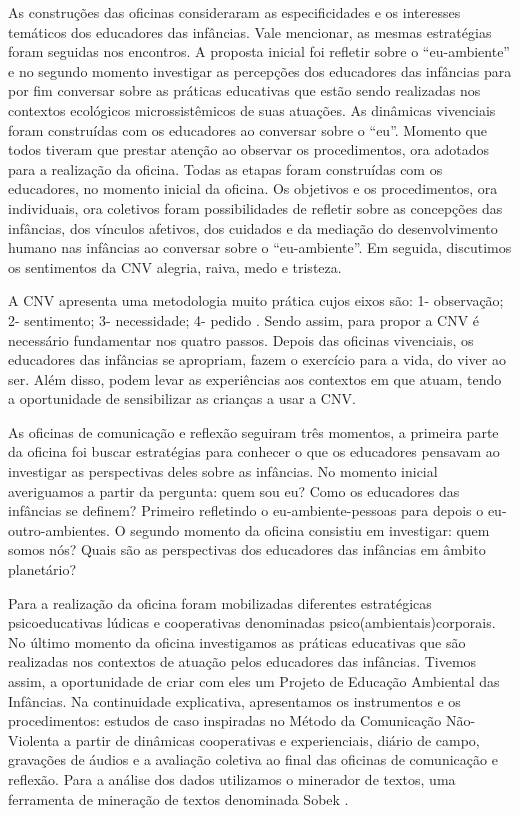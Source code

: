 \documentclass{textolivre}
\begin{document}
As construções das oficinas consideraram as especificidades e os interesses temáticos dos educadores das infâncias. Vale mencionar, as mesmas estratégias foram seguidas nos encontros. A proposta inicial foi refletir sobre o “eu-ambiente” e no segundo momento investigar as percepções dos educadores das infâncias para por fim conversar sobre as práticas educativas que estão sendo realizadas nos contextos ecológicos microssistêmicos de suas atuações. As dinâmicas vivenciais foram construídas com os educadores ao conversar sobre o “eu”. Momento que todos tiveram que prestar atenção ao observar os procedimentos, ora adotados para a realização da oficina. Todas as etapas foram construídas com os educadores, no momento inicial da oficina. Os objetivos e os procedimentos, ora individuais, ora coletivos foram possibilidades de refletir sobre as concepções das infâncias, dos vínculos afetivos, dos cuidados e da mediação do desenvolvimento humano nas infâncias ao conversar sobre o “eu-ambiente”. Em seguida, discutimos os sentimentos da CNV alegria, raiva, medo e tristeza. 

A CNV apresenta uma metodologia muito prática cujos eixos são: 1- observação; 2- sentimento; 3- necessidade; 4- pedido \cite{rosenberg2006}. Sendo assim, para propor a CNV é necessário fundamentar nos quatro passos. Depois das oficinas vivenciais, os educadores das infâncias se apropriam, fazem o exercício para a vida, do viver ao ser. Além disso, podem levar as experiências aos contextos em que atuam, tendo a oportunidade de sensibilizar as crianças a usar a CNV. 

As oficinas de comunicação e reflexão seguiram três momentos, a primeira parte da oficina foi buscar estratégias para conhecer o que os educadores pensavam ao investigar as perspectivas deles sobre as infâncias. No momento inicial averiguamos a partir da pergunta: quem sou eu? Como os educadores das infâncias se definem?  Primeiro refletindo o eu-ambiente-pessoas para depois o eu-outro-ambientes. O segundo momento da oficina consistiu em investigar: quem somos nós? Quais são as perspectivas dos educadores das infâncias em âmbito planetário? 

Para a realização da oficina foram mobilizadas diferentes estratégicas psicoeducativas lúdicas e cooperativas denominadas psico(ambientais)corporais. No último momento da oficina investigamos as práticas educativas que são realizadas nos contextos de atuação pelos educadores das infâncias. Tivemos assim, a oportunidade de criar com eles um Projeto de Educação Ambiental das Infâncias. Na continuidade explicativa, apresentamos os instrumentos e os procedimentos: estudos de caso inspiradas no Método da Comunicação Não-Violenta \cite{rosenberg2006} a partir de dinâmicas cooperativas e experienciais, diário de campo, gravações de áudios e a avaliação coletiva ao final das oficinas de comunicação e reflexão. Para a análise dos dados utilizamos o minerador de textos, uma ferramenta de mineração de textos denominada Sobek \cite{epstein2017}.
\end{document}

